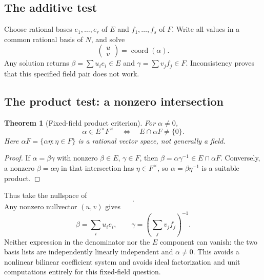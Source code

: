 \documentclass[11pt,letterpaper]{article}
\newtheorem{theorem}{Theorem}[section]
\theoremstyle{definition}\newtheorem{definition}[theorem]{Definition}
\theoremstyle{remark}\newtheorem{remark}[theorem]{Remark}
\begin{document}
\subsection{The additive test}
Choose rational bases $e_1,\ldots,e_r$ of $E$ and $f_1,\ldots,f_s$ of $F$. Write all values in a common rational basis of $N$, and solve
\begin{equation}
 [\,\operatorname{coord}(e_1)\ \cdots\ \operatorname{coord}(e_r)\
    \operatorname{coord}(f_1)\ \cdots\ \operatorname{coord}(f_s)\,]
 \begin{pmatrix}u\\v\end{pmatrix}=\operatorname{coord}(\alpha).
 \label{eq:fixedsum}
\end{equation}
Any solution returns $\beta=\sum u_ie_i\in E$ and $\gamma=\sum v_jf_j\in F$. Inconsistency proves that this specified field pair does not work.

\subsection{The product test: a nonzero intersection}
\begin{theorem}[Fixed-field product criterion]
For $\alpha\ne0$,
\begin{equation}
 \alpha\in E^\times F^\times
 \quad\Longleftrightarrow\quad E\cap\alpha F\ne\{0\}.
 \label{eq:fixedproduct}
\end{equation}
Here $\alpha F=\{\alpha\eta:\eta\in F\}$ is a rational vector space, not generally a field.
\end{theorem}
\begin{proof}
If $\alpha=\beta\gamma$ with nonzero $\beta\in E$, $\gamma\in F$, then $\beta=\alpha\gamma^{-1}\in E\cap\alpha F$. Conversely, a nonzero $\beta=\alpha\eta$ in that intersection has $\eta\in F^\times$, so $\alpha=\beta\eta^{-1}$ is a suitable product.
\end{proof}
Thus take the nullspace of
\begin{equation}
 [\,\operatorname{coord}(e_1)\ \cdots\ \operatorname{coord}(e_r)\
 -\operatorname{coord}(\alpha f_1)\ \cdots\ -\operatorname{coord}(\alpha f_s)\,].
 \label{eq:productmatrix}
\end{equation}
Any nonzero nullvector $(u,v)$ gives
\[
 \beta=\sum_i u_ie_i,\qquad \gamma=\left(\sum_jv_jf_j\right)^{-1}.
\]
Neither expression in the denominator nor the $E$ component can vanish: the two basis lists are independently linearly independent and $\alpha\ne0$. This avoids a nonlinear bilinear coefficient system and avoids ideal factorization and unit computations entirely for this fixed-field question.
\end{document}
